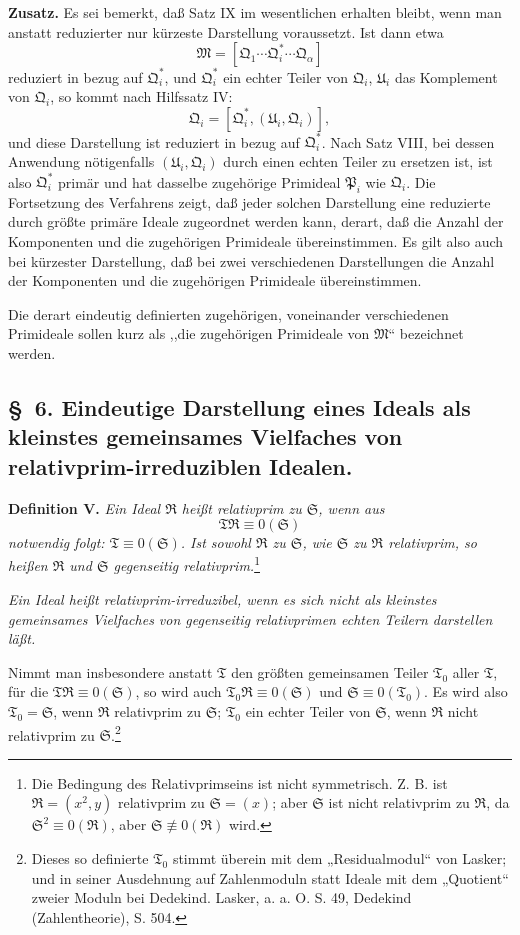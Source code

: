 \documentclass[11pt]{article}
\newcommand{\ideal}[1]{\mathfrak{#1}}
\begin{document}
\textbf{Zusatz.} Es sei bemerkt, daß Satz IX im wesentlichen erhalten bleibt, wenn man anstatt reduzierter nur kürzeste Darstellung voraussetzt. Ist dann etwa
\[
 \ideal M=[\ideal Q_1\cdots\ideal Q_i^*\cdots\ideal Q_\alpha]
\]
reduziert in bezug auf $\ideal Q_i^*$, und $\ideal Q_i^*$ ein echter Teiler von $\ideal Q_i$, $\ideal U_i$ das Komplement von $\ideal Q_i$, so kommt nach Hilfssatz IV:
\[
 \ideal Q_i=[\ideal Q_i^*,(\ideal U_i,\ideal Q_i)],
\]
und diese Darstellung ist reduziert in bezug auf $\ideal Q_i^*$. Nach Satz VIII, bei dessen Anwendung nötigenfalls $(\ideal U_i,\ideal Q_i)$ durch einen echten Teiler zu ersetzen ist, ist also $\ideal Q_i^*$ primär und hat dasselbe zugehörige Primideal $\ideal P_i$ wie $\ideal Q_i$. Die Fortsetzung des Verfahrens zeigt, daß jeder solchen Darstellung eine reduzierte durch größte primäre Ideale zugeordnet werden kann, derart, daß die Anzahl der Komponenten und die zugehörigen Primideale übereinstimmen. Es gilt also auch bei kürzester Darstellung, daß bei zwei verschiedenen Darstellungen die Anzahl der Komponenten und die zugehörigen Primideale übereinstimmen.

Die derart eindeutig definierten zugehörigen, voneinander verschiedenen Primideale sollen kurz als ,,die zugehörigen Primideale von $\ideal M$`` bezeichnet werden.




\subsection*{\S~6. Eindeutige Darstellung eines Ideals als kleinstes gemeinsames Vielfaches von relativprim-irreduziblen Idealen.}

\textbf{Definition V.} \emph{Ein Ideal $\ideal R$ heißt relativprim zu $\ideal S$, wenn aus
\[
 \ideal T\ideal R\equiv0(\ideal S)
\]
notwendig folgt: $\ideal T\equiv0(\ideal S)$. Ist sowohl $\ideal R$ zu $\ideal S$, wie $\ideal S$ zu $\ideal R$ relativprim, so heißen $\ideal R$ und $\ideal S$ gegenseitig relativprim.}\footnote{Die Bedingung des Relativprimseins ist nicht symmetrisch. Z. B. ist $\ideal R=(x^2,y)$ relativprim zu $\ideal S=(x)$; aber $\ideal S$ ist nicht relativprim zu $\ideal R$, da $\ideal S^2\equiv0(\ideal R)$, aber $\ideal S\not\equiv0(\ideal R)$ wird.}

\emph{Ein Ideal heißt relativprim-irreduzibel, wenn es sich nicht als kleinstes gemeinsames Vielfaches von gegenseitig relativprimen echten Teilern darstellen läßt.}

Nimmt man insbesondere anstatt $\ideal T$ den größten gemeinsamen Teiler $\ideal T_0$ aller $\ideal T$, für die $\ideal T\ideal R\equiv0(\ideal S)$, so wird auch $\ideal T_0\ideal R\equiv0(\ideal S)$ und $\ideal S\equiv0(\ideal T_0)$. Es wird also $\ideal T_0=\ideal S$, wenn $\ideal R$ relativprim zu $\ideal S$; $\ideal T_0$ ein echter Teiler von $\ideal S$, wenn $\ideal R$ nicht relativprim zu $\ideal S$.\footnote{Dieses so definierte $\ideal T_0$ stimmt überein mit dem „Residualmodul“ von Lasker; und in seiner Ausdehnung auf Zahlenmoduln statt Ideale mit dem „Quotient“ zweier Moduln bei Dedekind. Lasker, a. a. O. S. 49, Dedekind (Zahlentheorie), S. 504.}
\end{document}
